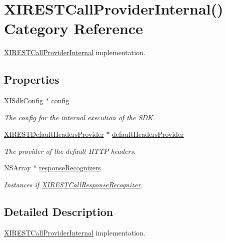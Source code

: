 \hypertarget{category_x_i_r_e_s_t_call_provider_internal_07_08}{}\section{X\+I\+R\+E\+S\+T\+Call\+Provider\+Internal() Category Reference}
\label{category_x_i_r_e_s_t_call_provider_internal_07_08}


\hyperlink{interface_x_i_r_e_s_t_call_provider_internal}{X\+I\+R\+E\+S\+T\+Call\+Provider\+Internal} implementation.  


\subsection*{Properties}
\begin{DoxyCompactItemize}
\item 
\hyperlink{class_x_i_sdk_config}{X\+I\+Sdk\+Config} $\ast$ \hyperlink{category_x_i_r_e_s_t_call_provider_internal_07_08_a1c338592900db5b63706135de8866126}{config}
\begin{DoxyCompactList}\small\item\em The config for the internal execution of the S\+DK. \end{DoxyCompactList}\item 
\hyperlink{interface_x_i_r_e_s_t_default_headers_provider}{X\+I\+R\+E\+S\+T\+Default\+Headers\+Provider} $\ast$ \hyperlink{category_x_i_r_e_s_t_call_provider_internal_07_08_a76c4c018045f7a6e81b4065c009596bd}{default\+Headers\+Provider}
\begin{DoxyCompactList}\small\item\em The provider of the default H\+T\+TP headers. \end{DoxyCompactList}\item 
N\+S\+Array $\ast$ \hyperlink{category_x_i_r_e_s_t_call_provider_internal_07_08_a4237fa2603c1975960fb81854773b15a}{response\+Recognizers}
\begin{DoxyCompactList}\small\item\em Instances if \hyperlink{}{X\+I\+R\+E\+S\+T\+Call\+Response\+Recognizer}. \end{DoxyCompactList}\end{DoxyCompactItemize}


\subsection{Detailed Description}
\hyperlink{interface_x_i_r_e_s_t_call_provider_internal}{X\+I\+R\+E\+S\+T\+Call\+Provider\+Internal} implementation. 

